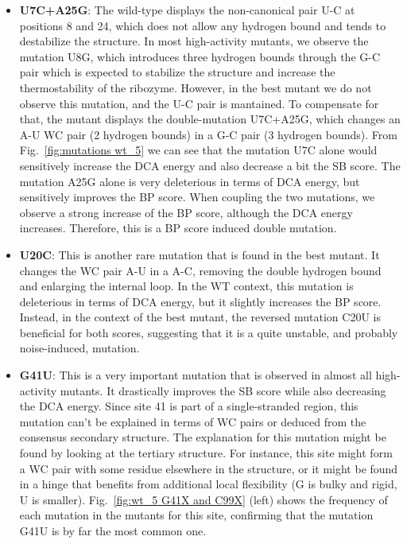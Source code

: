 \documentclass{article}
\begin{document}
\begin{itemize}
    \item \textbf{U7C+A25G}: The wild-type displays the non-canonical pair U-C at positions 8 and 24, which does not allow any hydrogen bound and tends to destabilize the structure.
    In most high-activity mutants, we observe the mutation U8G, which introduces three hydrogen bounds through the G-C pair which is expected to stabilize the structure and increase the thermostability of the ribozyme.
    However, in the best mutant we do not observe this mutation, and the U-C pair is mantained. To compensate for that, the mutant displays the double-mutation U7C+A25G, which changes an A-U WC pair (2 hydrogen bounds) in a G-C pair (3 hydrogen bounds).
    From Fig.~\ref{fig:mutations wt_5} we can see that the mutation U7C alone would sensitively increase the DCA energy and also decrease a bit the SB score.
    The mutation A25G alone is very deleterious in terms of DCA energy, but sensitively improves the BP score.
    When coupling the two mutations, we observe a strong increase of the BP score, although the DCA energy increases. Therefore, this is a BP score induced double mutation.

    \item \textbf{U20C}: This is another rare mutation that is found in the best mutant. It changes the WC pair A-U in a A-C, removing the double hydrogen bound and enlarging the internal loop.
    In the WT context, this mutation is deleterious in terms of DCA energy, but it slightly increases the BP score.
    Instead, in the context of the best mutant, the reversed mutation C20U is beneficial for both scores, suggesting that it is a quite unstable, and probably noise-induced, mutation.

    \item \textbf{G41U}: This is a very important mutation that is observed in almost all high-activity mutants.
    It drastically improves the SB score while also decreasing the DCA energy. Since site 41 is part of a single-stranded region, this mutation can't be explained in terms of WC pairs or deduced from the consensus secondary structure.
    The explanation for this mutation might be found by looking at the tertiary structure. For instance, this site might form a WC pair
    with some residue elsewhere in the structure, or it might be found in a hinge that benefits from additional local flexibility (G is bulky and rigid, U is smaller).
    Fig.~\ref{fig:wt_5 G41X and C99X} (left) shows the frequency of each mutation in the mutants for this site, confirming that the mutation G41U is by far the most common one.


\end{itemize}
\end{document}
